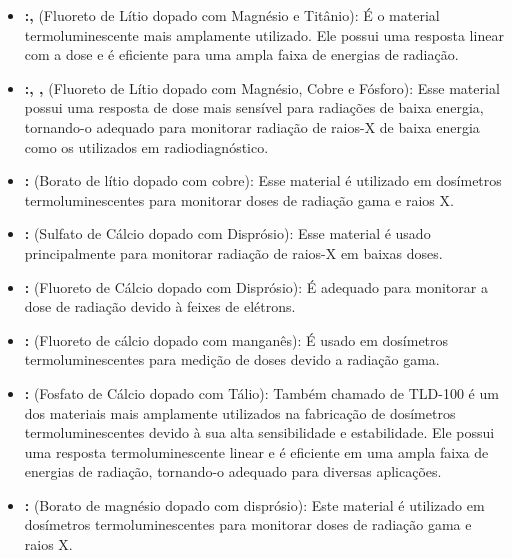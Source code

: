 \documentclass[11pt,a4paper]{article}
\begin{document}
		\begin{itemize}[label=\textcolor{CarnationPink}{$\star$}]
			\item \textbf{:, } (Fluoreto de Lítio dopado com Magnésio e Titânio): É o material termoluminescente mais amplamente utilizado. Ele possui uma resposta linear com a dose e é eficiente para uma ampla faixa de energias de radiação.
			
			\item \textbf{:, , } (Fluoreto de Lítio dopado com Magnésio, Cobre e Fósforo): Esse material possui uma resposta de dose mais sensível para radiações de baixa energia, tornando-o adequado para monitorar radiação de raios-X de baixa energia como os utilizados em radiodiagnóstico.
			
			\item \textbf{:} (Borato de lítio dopado com cobre): Esse material é utilizado em dosímetros termoluminescentes para monitorar doses de radiação gama e raios X.
			
			\item \textbf{:} (Sulfato de Cálcio dopado com Disprósio): Esse material é usado principalmente para monitorar radiação de raios-X em baixas doses.
			
			\item \textbf{:} (Fluoreto de Cálcio dopado com Disprósio): É adequado para monitorar a dose de radiação devido à feixes de elétrons.
			
			\item \textbf{:} (Fluoreto de cálcio dopado com manganês): É usado em dosímetros termoluminescentes para medição de doses devido a radiação gama.
			
			\item \textbf{:} (Fosfato de Cálcio dopado com Tálio): Também chamado de TLD-100 é um dos materiais mais amplamente utilizados na fabricação de dosímetros termoluminescentes devido à sua alta sensibilidade e estabilidade. Ele possui uma resposta termoluminescente linear e é eficiente em uma ampla faixa de energias de radiação, tornando-o adequado para diversas aplicações.
			
			\item \textbf{:} (Borato de magnésio dopado com disprósio): Este material é utilizado em dosímetros termoluminescentes para monitorar doses de radiação gama e raios X.
		\end{itemize}
\end{document}

